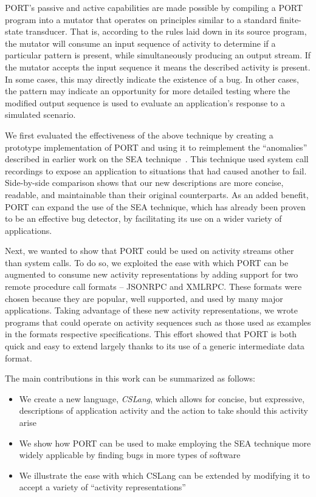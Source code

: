 PORT's passive and active capabilities are made possible
by compiling a PORT program
into a mutator
that operates on principles similar
to a standard finite-state transducer.
That is,
according to the rules laid down in its source program,
the mutator will consume an input sequence of activity
to determine if a particular pattern is present,
while simultaneously producing an output stream.
If the mutator accepts the input sequence
it means the described activity is present.
In some cases,
this may directly indicate
the existence of a bug.
In other cases,
the pattern may
indicate an opportunity
for more detailed testing
where the modified output sequence is used
to evaluate an application's response to a simulated scenario.

We first evaluated the effectiveness of the above technique
by creating a prototype implementation of PORT
and using it to
reimplement the ``anomalies''
described in earlier work on the SEA technique~\cite{DBLP:conf/issre/MooreCFW19}.
This technique used system call recordings
to expose an application to situations that had caused another to fail.
Side-by-side comparison shows that our new
descriptions are more concise,
readable,
and maintainable
than their original counterparts.
As an added benefit,
PORT can expand the use of the SEA technique,
which has already been proven
to be an effective bug detector,
by facilitating its use
on a wider variety of applications.

Next, we wanted to
show that PORT
could be used on activity streams
other than system calls.
To do so,
we exploited the ease with which
PORT can be augmented
to consume new activity representations
by adding support for two remote procedure call formats -- JSONRPC and XMLRPC.
These formats were chosen
because they are popular,
well supported, and
used by many major applications.
Taking advantage of these new activity representations,
we wrote programs that could operate on activity sequences such as those
used as examples in the formats respective specifications.  This effort
showed that PORT is both quick and easy to extend largely thanks to its
use of a generic intermediate data format.

The main contributions in this work can be summarized as follows:

\begin{itemize}

\item{We create a new language, {\em CSLang},
  which allows for concise, but expressive, descriptions of
    application activity and the action to take should this activity arise}

\item{We show how PORT can be used to make employing the SEA technique
  more widely applicable by finding bugs in more types of software}

\item{We illustrate the ease with which CSLang can be extended by modifying
  it to accept a variety of ``activity representations''}

\end{itemize}

